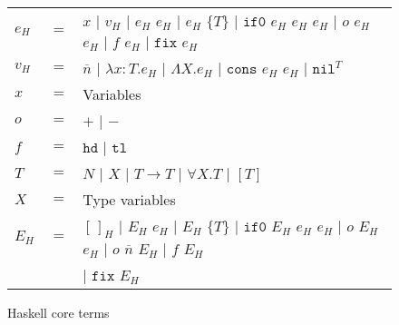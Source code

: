 \begin{figure}[p]
\label{hct}
\caption{Haskell core terms}
\begin{center}
\begin{tabular}{lcl}
$e_{H}$ & $=$ & $x$ $\vert$ $v_{H}$ $\vert$ $e_{H}$ $e_{H}$ $\vert$ $e_{H}$ $\lbrace T\rbrace$ $\vert$ $\mathtt{if0}$ $e_{H}$ $e_{H}$ $e_{H}$ $\vert$ $o$ $e_{H}$ $e_{H}$ $\vert$ $f$ $e_{H}$ $\vert$ $\mathtt{fix}$ $e_{H}$ \\
$v_{H}$ & $=$ & $\overline{n}$ $\vert$ $\lambda x:T.e_{H}$ $\vert$ $\Lambda X.e_{H}$ $\vert$ $\mathtt{cons}$ $e_{H}$ $e_{H}$ $\vert$ $\mathtt{nil}^{T}$ \\
$x$ & $=$ & Variables \\
$o$ & $=$ & $\mathtt{+}$ $\vert$ $\mathtt{-}$ \\
$f$ & $=$ & $\mathtt{hd}$ $\vert$ $\mathtt{tl}$ \\
$T$ & $=$ & $N$ $\vert$ $X$ $\vert$ $T\rightarrow T$ $\vert$ $\forall X.T$ $\vert$ $[T]$ \\
$X$ & $=$ & Type variables \\
$E_{H}$ & $=$ & $[\,]_{H}$ $\vert$ $E_{H}$ $e_{H}$ $\vert$ $E_{H}$ $\lbrace T\rbrace$ $\vert$ $\mathtt{if0}$ $E_{H}$ $e_{H}$ $e_{H}$ $\vert$ $o$ $E_{H}$ $e_{H}$ $\vert$ $o$ $\overline{n}$ $E_{H}$ $\vert$ $f$ $E_{H}$ \\
&& $\vert$ $\mathtt{fix}$ $E_{H}$
\end{tabular}
\end{center}
\end{figure}